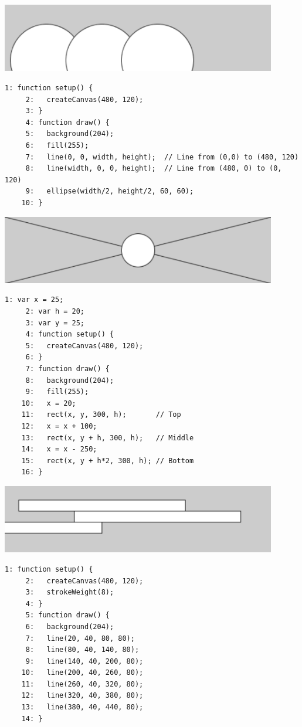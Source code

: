 \documentclass[a4j]{ltjsarticle}
\begin{document}
\includegraphics[height=3cm]{image/Ex_04_02.pdf}
\begin{lstlisting}[caption=Ex\_04\_03.js]
     1: function setup() {
     2:   createCanvas(480, 120);
     3: }
     4: function draw() {
     5:   background(204);
     6:   fill(255);
     7:   line(0, 0, width, height);  // Line from (0,0) to (480, 120)
     8:   line(width, 0, 0, height);  // Line from (480, 0) to (0, 120)
     9:   ellipse(width/2, height/2, 60, 60);
    10: }
\end{lstlisting}
\includegraphics[height=3cm]{image/Ex_04_03.pdf}
\begin{lstlisting}[caption=Ex\_04\_04.js]
     1: var x = 25;
     2: var h = 20;
     3: var y = 25;
     4: function setup() {
     5:   createCanvas(480, 120);
     6: }
     7: function draw() {
     8:   background(204);
     9:   fill(255);
    10:   x = 20; 
    11:   rect(x, y, 300, h);       // Top
    12:   x = x + 100;
    13:   rect(x, y + h, 300, h);   // Middle
    14:   x = x - 250;
    15:   rect(x, y + h*2, 300, h); // Bottom
    16: }
\end{lstlisting}
\includegraphics[height=3cm]{image/Ex_04_04.pdf}
\begin{lstlisting}[caption=Ex\_04\_05.js]
     1: function setup() {
     2:   createCanvas(480, 120);
     3:   strokeWeight(8);
     4: }
     5: function draw() {
     6:   background(204);  
     7:   line(20, 40, 80, 80);
     8:   line(80, 40, 140, 80);
     9:   line(140, 40, 200, 80);
    10:   line(200, 40, 260, 80);
    11:   line(260, 40, 320, 80);
    12:   line(320, 40, 380, 80);
    13:   line(380, 40, 440, 80);
    14: }
\end{lstlisting}
\end{document}
